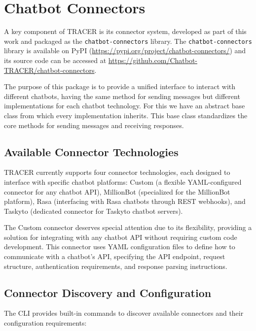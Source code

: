 \section{Chatbot Connectors}

A key component of \ac{TRACER} is its connector system,
developed as part of this work and
packaged as the \texttt{chatbot-connectors} library.
The \texttt{chatbot-connectors} library is available on PyPI
(\url{https://pypi.org/project/chatbot-connectors/})
and its source code can be accessed at
\url{https://github.com/Chatbot-TRACER/chatbot-connectors}.

The purpose of this package is to provide a unified interface
to interact with different chatbots,
having the same method for sending messages
but different implementations for each chatbot technology.
For this we have an abstract base class
from which every implementation inherits.
This base class standardizes the core methods
for sending messages and receiving responses.

\subsection{Available Connector Technologies}

\ac{TRACER} currently supports four connector technologies,
each designed to interface with specific chatbot platforms:
Custom (a flexible YAML-configured connector for any chatbot \ac{API}),
MillionBot (specialized for the MillionBot platform),
Rasa (interfacing with Rasa chatbots through \ac{REST} webhooks),
and Taskyto (dedicated connector for Taskyto chatbot servers).

The Custom connector deserves special attention due to its flexibility,
providing a solution for integrating with any chatbot \ac{API}
without requiring custom code development.
This connector uses YAML configuration files
to define how to communicate with a chatbot's \ac{API},
specifying the \ac{API} endpoint, request structure,
authentication requirements, and response parsing instructions.

\subsection{Connector Discovery and Configuration}

The \ac{CLI} provides built-in commands to discover available connectors
and their configuration requirements:

